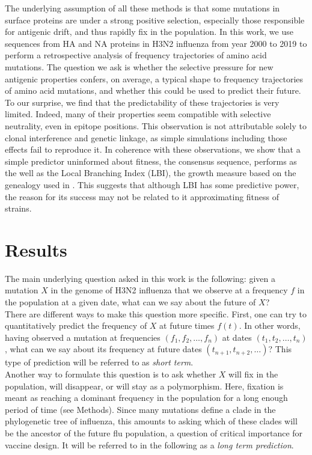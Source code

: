 \documentclass{article}
\begin{document}
	The underlying assumption of all these methods is that some mutations in surface proteins are under a strong positive selection, especially those responsible for antigenic drift, and thus rapidly fix in the population. In this work, we use sequences from HA and NA proteins in H3N2 influenza from year 2000 to 2019 to perform a retrospective analysis of frequency trajectories of amino acid mutations. The question we ask is whether the selective pressure for new antigenic properties confers, on average, a typical shape to frequency trajectories of amino acid mutations, and whether this could be used to predict their future. To our surprise, we find that the predictability of these trajectories is very limited. Indeed, many of their properties seem compatible with selective neutrality, even in epitope positions. This observation is not attributable solely to clonal interference and genetic linkage, as simple simulations including those effects fail to reproduce it. In coherence with these observations, we show that a simple predictor uninformed about fitness, the consensus sequence, performs as the well as the Local Branching Index (LBI), the growth measure based on the genealogy used in \cite{neher_predicting_2014}. This suggests that although LBI has some predictive power, the reason for its success may not be related to it approximating fitness of strains.  



\section*{Results} %
\label{sec:results}

	The main underlying question asked in this work is the following: given a mutation $X$ in the genome of H3N2 influenza that we observe at a frequency $f$ in the population at a given date, what can we say about the future of $X$?  \\
	There are different ways to make this question more specific. First, one can try to quantitatively predict the frequency of $X$ at future times $f(t)$. In other words, having observed a mutation at frequencies $(f_1, f_2,\ldots,f_n)$ at dates $(t_1,t_2,\ldots,t_n)$, what can we say about its frequency at future dates $(t_{n+1}, t_{n+2},\ldots)$? %
	This type of prediction will be referred to as \emph{short term}.  \\
	Another way to formulate this question is to ask whether $X$ will fix in the population, will disappear, or will stay as a polymorphism. Here, fixation is meant as reaching a dominant frequency in the population for a long enough period of time (see Methods). Since many mutations define a clade in the phylogenetic tree of influenza, this amounts to asking which of these clades will be the ancestor of the future flu population, a question of critical importance for vaccine design. It will be referred to in the following as a \emph{long term prediction}.
\end{document}
